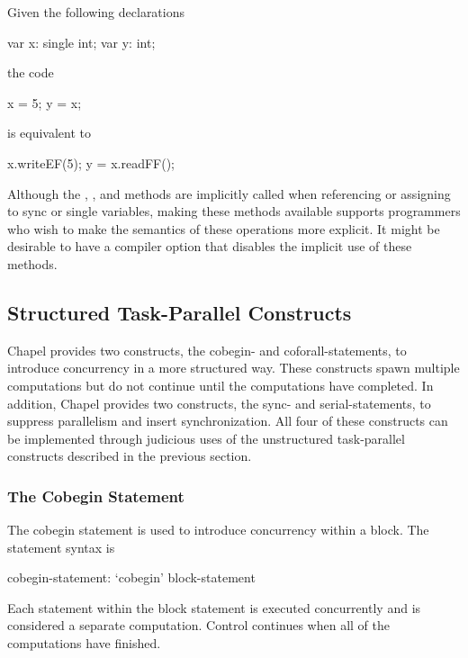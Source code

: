 \begin{example}
Given the following declarations
\begin{chapel}
var x: single int;
var y: int;
\end{chapel}
the code
\begin{chapel}
x = 5;
y = x;
\end{chapel}
is equivalent to
\begin{chapel}
x.writeEF(5);
y = x.readFF();
\end{chapel}
\end{example}

\begin{rationale}
Although the , , and  methods
are implicitly called when referencing or assigning to sync or single
variables, making these methods available supports programmers who
wish to make the semantics of these operations more explicit.  It
might be desirable to have a compiler option that disables the
implicit use of these methods.
\end{rationale}

\subsection{Structured Task-Parallel Constructs}
\label{structured_task_parallelism}

Chapel provides two constructs, the cobegin- and coforall-statements,
to introduce concurrency in a more structured way.  These constructs
spawn multiple computations but do not continue until the computations
have completed.  In addition, Chapel provides two constructs, the
sync- and serial-statements, to suppress parallelism and insert
synchronization.  All four of these constructs can be implemented
through judicious uses of the unstructured task-parallel constructs
described in the previous section.

\subsubsection{The Cobegin Statement}
\label{Cobegin}

The cobegin statement is used to introduce concurrency within a
block.  The  statement syntax is
\begin{syntax}
cobegin-statement:
  `cobegin' block-statement
\end{syntax}
Each statement within the block statement is executed concurrently and
is considered a separate computation.  Control continues when all of
the computations have finished.


